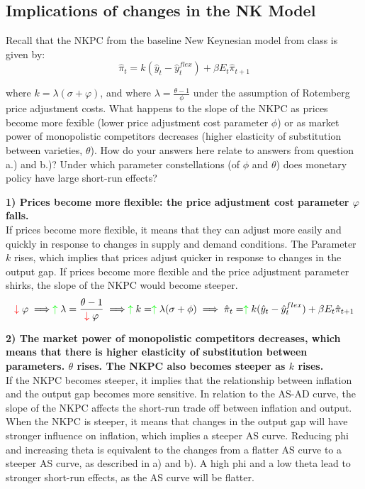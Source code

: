 \documentclass[a4paper,11pt]{article}
\newcommand{\pos}{\color{green} \uparrow \color{black}}
\newcommand{\negative}{\color{red} \downarrow \color{black}}
\begin{document}
\begin{qbox}{\subsection{Implications of changes in the NK Model}}
Recall that the NKPC from the baseline New Keynesian model from class
is given by:
\begin{equation}
    \hat{\pi}_t = k(\hat{y}_t-\hat{y}_t^{flex})+\beta E_t \hat{\pi}_{t+1}
\end{equation}

where $k=\lambda (\sigma + \varphi)$, and where $\lambda = \frac{\theta-1}{\phi}$ under the assumption of Rotemberg price adjustment costs. What happens to the slope of the NKPC as prices become more fexible (lower price adjustment cost parameter $\phi$) or as market power of monopolistic competitors decreases (higher elasticity of substitution between varieties, $\theta$). How do your answers here relate to answers from question a.) and b.)? Under which parameter constellations (of $\phi$ and $\theta$) does monetary policy have large short-run effects?
\end{qbox}
\textbf{1) Prices become more flexible: the price adjustment cost parameter $\varphi$ falls.}\\ 

If prices become more flexible, it means that they can adjust more easily and quickly in response to changes in supply and demand conditions. 
The Parameter $k$ rises, which implies that prices adjust quicker in response to changes in the output gap. If prices become more flexible and the price adjustment parameter shirks, the slope of the NKPC would become steeper. \\

$$\negative \varphi \implies \pos\lambda = \frac{\theta-1}{\negative \varphi} \implies \pos k = \pos \lambda (\sigma + \phi) \implies \hat{\pi}_t = \pos k(\hat{y}_t-\hat{y}_t^{flex})+\beta E_t \hat{\pi}_{t+1}$$

\textbf{2) The market power of monopolistic competitors decreases, which means that there is higher elasticity of substitution between parameters. $\theta$ rises.  
The NKPC also becomes steeper as $k$ rises.} \\

If the NKPC becomes steeper, it implies that the relationship between inflation and the output gap becomes more sensitive. In relation to the AS-AD curve, the slope of the NKPC affects the short-run trade off between inflation and output. When the NKPC is steeper, it means that changes in the output gap will have stronger influence on inflation, which implies a steeper AS curve. Reducing phi and increasing theta is equivalent to the changes from a flatter AS curve to a steeper AS curve, as described in a) and b). 
A high phi and a low theta lead to stronger short-run effects, as the AS curve will be flatter. \\
\end{document}
